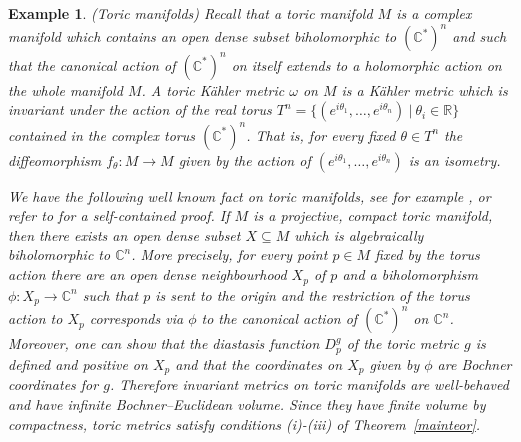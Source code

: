 \documentclass[12pt]{amsart}
\newcommand{\R}{\mathbb{R}}
\newcommand{\C}{\mathbb{C}}
\newtheorem{ex}{Example}
\begin{document}
\begin{ex}\rm\label{toric}(Toric manifolds)
	Recall that a toric manifold $M$ is a complex manifold which contains an open dense subset biholomorphic to $(\C^*)^n$ and such that the canonical action of $(\C^*)^n$ on itself %
	extends to a holomorphic action on the whole manifold $M$.
	A toric K\"ahler metric $\omega$ on $M$ is a K\"ahler metric which is invariant under the action of the real torus $T^n = \{ (e^{i \theta_1}, \dots , e^{i \theta_n}) \ | \ \theta_i \in \R \}$ contained in the complex torus $({\C}^*)^n$.
	That is, for every fixed $\theta \in T^n$ the diffeomorphism $f_{\theta}: M \rightarrow M$ given by the action of $(e^{i \theta_1}, \dots , e^{i \theta_n})$ is an isometry.
	
	We have the following well known fact on toric manifolds, see for example \cite[Section~2.2.1]{Donaldson04ConjInKahler}, \cite[Proposition~2.18]{Batyrev93QuantumCohomology} or refer to  \cite[Appendix]{ArezzoLoiZuddas16Toric}  for a self-contained proof.
		If $M$ is a projective, compact toric manifold, then there exists an open dense subset $X \subseteq M$ which is algebraically biholomorphic to $\C^n$. More precisely, for every point $p \in M$ fixed by the torus action there are an open dense neighbourhood $X_p$ of $p$ and a biholomorphism $\phi: X_p \rightarrow \C^n$ such that $p$ is sent to the origin and the restriction of the torus action to $X_p$ corresponds via $\phi$ to the canonical action of $(\C^*)^n$ on $\C^n$. Moreover, one can show \cite[Theorem~2.6]{ArezzoLoiZuddas16Toric} that the diastasis function $D_p^g$ of the toric metric $g$ is defined and positive on $X_p$ and that the coordinates on $X_p$ given by $\phi$ are Bochner coordinates for $g$.
		 Therefore invariant metrics on toric manifolds are well-behaved and have infinite Bochner--Euclidean volume. Since they have finite volume by compactness, toric metrics satisfy conditions (i)-(iii) of Theorem~\ref{mainteor}.
\end{ex}
\end{document}
